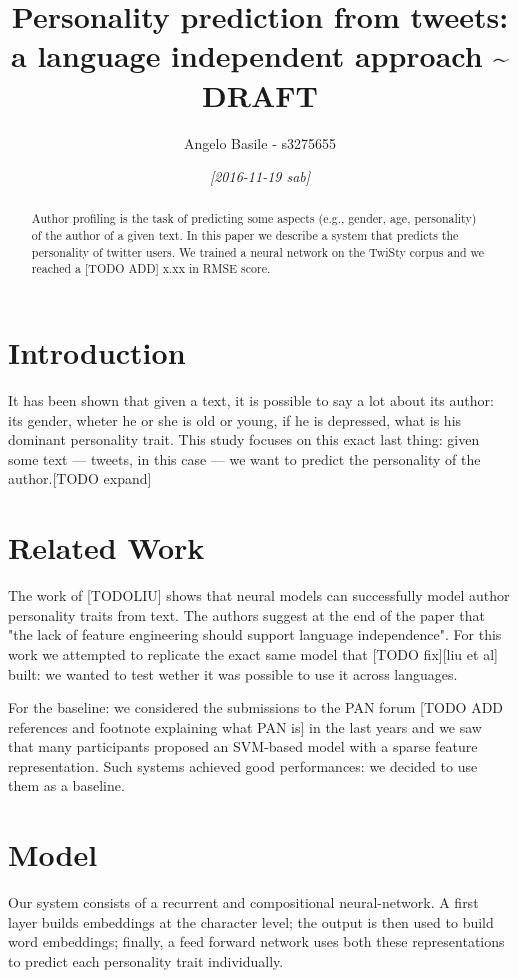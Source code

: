 \documentclass[article,11pt,nofixltx2e]{article}
\author{Angelo Basile - s3275655}
\date{\textit{[2016-11-19 sab]}}
\title{Personality prediction from tweets: a language independent approach \textasciitilde{} DRAFT}
\begin{document}
\maketitle

\begin{abstract}
Author profiling is the task of predicting some aspects (e.g., gender, age, personality) of the author of a given text. In this paper we describe a system that predicts the personality of twitter users. We trained a neural network on the TwiSty corpus and we reached a [TODO ADD] x.xx in RMSE score.
\end{abstract}

\section{Introduction}
\label{sec-1}

It has been shown that given a text, it is possible to say a lot about its author: its gender, wheter he or she is old or young, if he is depressed, what is his dominant personality trait. This study focuses on this exact last thing: given some text --- tweets, in this case --- we want to predict the personality of the author.[TODO expand]

\section{Related Work}
\label{sec-2}

The work of [TODOLIU] shows that neural models can successfully model author personality traits from text. The authors suggest at the end of the paper that "the lack of feature engineering should support language independence". For this work we attempted to replicate the exact same model that [TODO fix][liu et al] built: we wanted to test wether it was possible to use it across languages.

For the baseline: we considered the submissions to the PAN forum [TODO ADD references and footnote explaining what PAN is] in the last years and we saw that many participants proposed an SVM-based model with a sparse feature representation. Such systems achieved good performances: we decided to use them as a baseline.

\section{Model}
\label{sec-3}

Our system consists of a recurrent and compositional neural-network. A first layer builds embeddings at the character level; the output is then used to build word embeddings; finally, a feed forward network uses both these representations to predict each personality trait individually.
\end{document}
